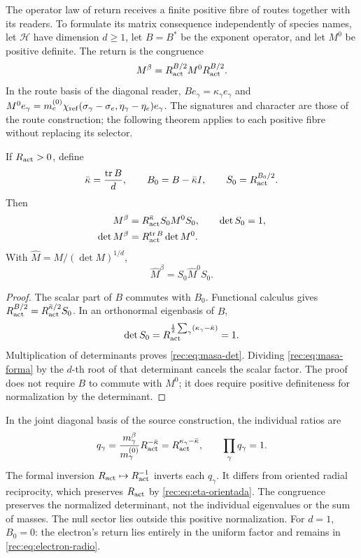 The operator law of return receives a finite positive fibre of routes together with its readers. To formulate its matrix consequence independently of species names, let \(\mathcal H\) have dimension \(d\ge1\), let \(B=B^*\) be the exponent operator, and let \(M^0\) be positive definite. The return is the congruence
\begin{equation}
 M^\beta=R_{\rm act}^{B/2}M^0R_{\rm act}^{B/2}.
 \label{rec:eq:masa-operador}
\end{equation}
In the route basis of the diagonal reader, \(Be_\gamma=\kappa_\gamma e_\gamma\) and
\(M^0e_\gamma=m_e^{(0)}\chi_{\rm ref}(\sigma_\gamma-\sigma_e,\eta_\gamma-\eta_e)e_\gamma\). The signatures and character are those of the route construction; the following theorem applies to each positive fibre without replacing its selector.

\begin{theorem}
\label{rec:thm:masa}
If \(R_{\rm act}>0\), define
\[
 \bar\kappa=\frac{\operatorname{tr} B}{d},\qquad B_0=B-\bar\kappa I,
 \qquad S_0=R_{\rm act}^{B_0/2}.
\]
Then
\begin{align}
 M^\beta&=R_{\rm act}^{\bar\kappa}S_0M^0S_0,
 \qquad\det S_0=1,\label{rec:eq:masa-forma}\\
 \det M^\beta&=R_{\rm act}^{\operatorname{tr} B}\det M^0.\label{rec:eq:masa-det}
\end{align}
With \(\widehat M=M/(\det M)^{1/d}\),
\begin{equation}
 \widehat M^\beta=S_0\widehat M^0S_0.
 \label{rec:eq:masa-normalizada}
\end{equation}
\end{theorem}
\begin{proof}
The scalar part of \(B\) commutes with \(B_0\). Functional calculus gives
\(R_{\rm act}^{B/2}=R_{\rm act}^{\bar\kappa/2}S_0\). In an orthonormal eigenbasis of \(B\),
\[
 \det S_0=R_{\rm act}^{\frac12\sum_\gamma(\kappa_\gamma-\bar\kappa)}=1.
\]
Multiplication of determinants proves \eqref{rec:eq:masa-det}. Dividing \eqref{rec:eq:masa-forma} by the \(d\)-th root of that determinant cancels the scalar factor. The proof does not require \(B\) to commute with \(M^0\); it does require positive definiteness for normalization by the determinant.
\end{proof}

In the joint diagonal basis of the source construction, the individual ratios are
\[
 q_\gamma=\frac{m_\gamma^\beta}{m_\gamma^{(0)}}R_{\rm act}^{-\bar\kappa}
 =R_{\rm act}^{\kappa_\gamma-\bar\kappa},\qquad
 \prod_\gamma q_\gamma=1.
\]
The formal inversion \(R_{\rm act}\mapsto R_{\rm act}^{-1}\) inverts each \(q_\gamma\). It differs from oriented radial reciprocity, which preserves \(R_{\rm act}\) by \eqref{rec:eq:eta-orientada}. The congruence preserves the normalized determinant, not the individual eigenvalues or the sum of masses. The null sector lies outside this positive normalization. For \(d=1\), \(B_0=0\): the electron's return lies entirely in the uniform factor and remains in \eqref{rec:eq:electron-radio}.

